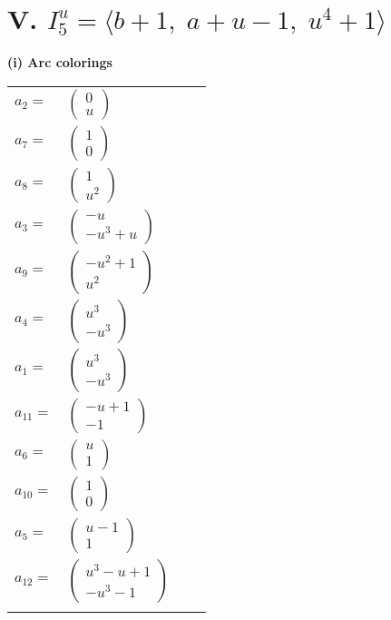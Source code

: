 \documentclass[1p]{elsarticle_modified}
\theoremstyle{definition}
\begin{document}
\centering \section*{V. $I^u_{5}= \langle b+1,\;a+u-1,\;u^4+1 \rangle$}
\flushleft \textbf{(i) Arc colorings}\\
\begin{tabular}{m{7pt} m{180pt} m{7pt} m{180pt} }
\flushright $a_{2}=$&$\begin{pmatrix}0\\u\end{pmatrix}$ \\
\flushright $a_{7}=$&$\begin{pmatrix}1\\0\end{pmatrix}$ \\
\flushright $a_{8}=$&$\begin{pmatrix}1\\u^2\end{pmatrix}$ \\
\flushright $a_{3}=$&$\begin{pmatrix}- u\\- u^3+u\end{pmatrix}$ \\
\flushright $a_{9}=$&$\begin{pmatrix}- u^2+1\\u^2\end{pmatrix}$ \\
\flushright $a_{4}=$&$\begin{pmatrix}u^3\\- u^3\end{pmatrix}$ \\
\flushright $a_{1}=$&$\begin{pmatrix}u^3\\- u^3\end{pmatrix}$ \\
\flushright $a_{11}=$&$\begin{pmatrix}- u+1\\-1\end{pmatrix}$ \\
\flushright $a_{6}=$&$\begin{pmatrix}u\\1\end{pmatrix}$ \\
\flushright $a_{10}=$&$\begin{pmatrix}1\\0\end{pmatrix}$ \\
\flushright $a_{5}=$&$\begin{pmatrix}u-1\\1\end{pmatrix}$ \\
\flushright $a_{12}=$&$\begin{pmatrix}u^3- u+1\\- u^3-1\end{pmatrix}$\\&\end{tabular}
\end{document}
